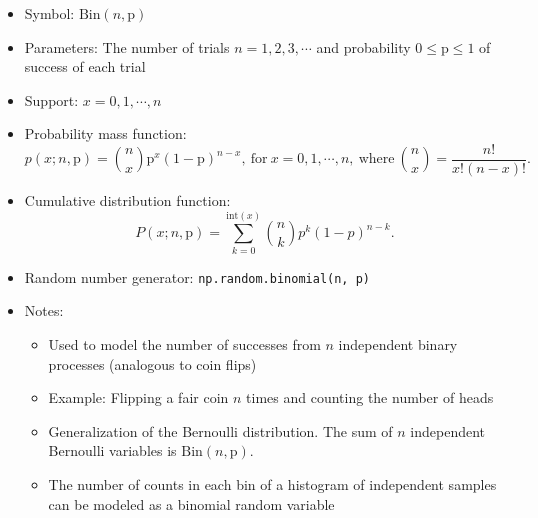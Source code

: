 \documentclass[
  letterpaper,
  DIV=11,
  numbers=noendperiod]{scrreprt}
\newenvironment{Shaded}{\begin{snugshade}}{\end{snugshade}}
\newcommand{\DecValTok}[1]{\textcolor[rgb]{0.68,0.00,0.00}{#1}}
\newcommand{\FloatTok}[1]{\textcolor[rgb]{0.68,0.00,0.00}{#1}}
\newcommand{\NormalTok}[1]{\textcolor[rgb]{0.00,0.23,0.31}{#1}}
\newcommand{\OperatorTok}[1]{\textcolor[rgb]{0.37,0.37,0.37}{#1}}
\newcommand{\SpecialCharTok}[1]{\textcolor[rgb]{0.37,0.37,0.37}{#1}}
\newcommand{\SpecialStringTok}[1]{\textcolor[rgb]{0.13,0.47,0.30}{#1}}
\newcommand{\StringTok}[1]{\textcolor[rgb]{0.13,0.47,0.30}{#1}}
\newcommand{\VariableTok}[1]{\textcolor[rgb]{0.07,0.07,0.07}{#1}}
\providecommand{\tightlist}{%
  \setlength{\itemsep}{0pt}\setlength{\parskip}{0pt}}\usepackage{longtable,booktabs,array}
\begin{document}
\begin{itemize}
\tightlist
\item
  Symbol: \(\text{Bin}(n, \text{p})\)
\item
  Parameters: The number of trials \(n=1,2,3,\cdots\) and probability
  \(0 \leq \text{p} \leq 1\) of success of each trial
\item
  Support: \(x = 0, 1, \cdots, n\)
\item
  Probability mass function:
  \[p(x; n,\text{p}) = \binom{n}{x} \text{p}^{x} (1-\text{p})^{n-x}, \ \text{for} \ x=0,1,\cdots,n, \ \text{where} \ \binom{n}{x} = \frac{n!}{x!(n-x)!}.\]
\item
  Cumulative distribution function:
  \[P(x; n,\text{p}) = \sum_{k=0}^{\text{int}(x)} {n \choose k} p^k(1-p)^{n-k}.\]
\item
  Random number generator: \texttt{np.random.binomial(n,\ p)}
\item
  Notes:

  \begin{itemize}
  \tightlist
  \item
    Used to model the number of successes from \(n\) independent binary
    processes (analogous to coin flips)
  \item
    Example: Flipping a fair coin \(n\) times and counting the number of
    heads
  \item
    Generalization of the Bernoulli distribution. The sum of \(n\)
    independent Bernoulli variables is \(\text{Bin}(n, \text{p})\).
  \item
    The number of counts in each bin of a histogram of independent
    samples can be modeled as a binomial random variable
  \end{itemize}
\end{itemize}

\begin{Shaded}
\end{Shaded}
\end{document}
